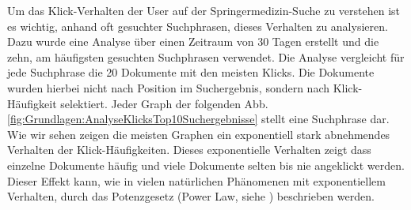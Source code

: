 
Um das Klick-Verhalten der User auf der Springermedizin-Suche zu verstehen ist es wichtig, anhand oft gesuchter Suchphrasen, dieses Verhalten zu analysieren. Dazu wurde eine Analyse über einen Zeitraum von 30 Tagen erstellt und die zehn, am häufigsten gesuchten Suchphrasen verwendet. Die Analyse vergleicht für jede Suchphrase die 20 Dokumente mit den meisten Klicks. Die Dokumente wurden hierbei nicht nach Position im Suchergebnis, sondern nach Klick-Häufigkeit selektiert. Jeder Graph der folgenden Abb. \ref{fig:Grundlagen:AnalyseKlicksTop10Suchergebnisse} stellt eine Suchphrase dar. Wie wir sehen zeigen die meisten Graphen ein exponentiell stark abnehmendes Verhalten der Klick-Häufigkeiten. Dieses exponentielle Verhalten zeigt dass einzelne Dokumente häufig und viele Dokumente selten bis nie angeklickt werden. Dieser Effekt kann, wie in vielen natürlichen Phänomenen mit exponentiellem Verhalten, durch das Potenzgesetz (Power Law, siehe \cite{PowerLaw}) beschrieben werden. 

